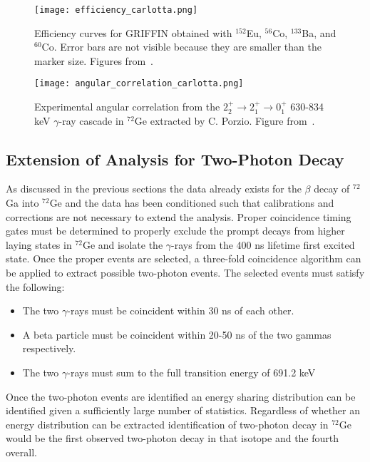 \documentclass[cnatzke_thesis_proposal.tex]{subfiles}
\begin{document}
\begin{figure}[htbp]
  \centering
  \texttt{[image: efficiency\_carlotta.png]}
  \caption{Efficiency curves for GRIFFIN obtained with $^{152}$Eu, $^{56}$Co, $^{133}$Ba, and $^{60}$Co. Error bars are not visible because they are smaller than the marker size. Figures from~\cite{porzio_configuration_2021}.}
  \label{fig:efficiency_carlotta}
\end{figure}

\begin{figure}[htbp]
  \centering
  \texttt{[image: angular\_correlation\_carlotta.png]}
  \caption{Experimental angular correlation from the $2_2^+ \rightarrow 2_1^+ \rightarrow 0_1^+$ 630-834 keV $\gamma$-ray cascade in $^{72}$Ge extracted by C. Porzio. Figure from~\cite{porzio_configuration_2021}.}
  \label{fig:angular_correlation_carlotta}
\end{figure}


\subsection{Extension of Analysis for Two-Photon Decay}
As discussed in the previous sections the data already exists for the $\beta$ decay of $^{72}$Ga into $^{72}$Ge and the data has been conditioned such that calibrations and corrections are not necessary to extend the analysis. 
Proper coincidence timing gates must be determined to properly exclude the prompt decays from higher laying states in $^{72}$Ge and isolate the $\gamma$-rays from the 400 ns lifetime first excited state. 
Once the proper events are selected, a three-fold coincidence algorithm can be applied to extract possible two-photon events. 
The selected events must satisfy the following: 

\begin{itemize}
  \item The two $\gamma$-rays must be coincident within 30 ns of each other.
  \item A beta particle must be coincident within 20-50 ns of the two gammas respectively.
  \item The two $\gamma$-rays must sum to the full transition energy of 691.2 keV
\end{itemize}

Once the two-photon events are identified an energy sharing distribution can be identified given a sufficiently large number of statistics. 
Regardless of whether an energy distribution can be extracted identification of two-photon decay in $^{72}$Ge would be the first observed two-photon decay in that isotope and the fourth overall. 


\end{document}
